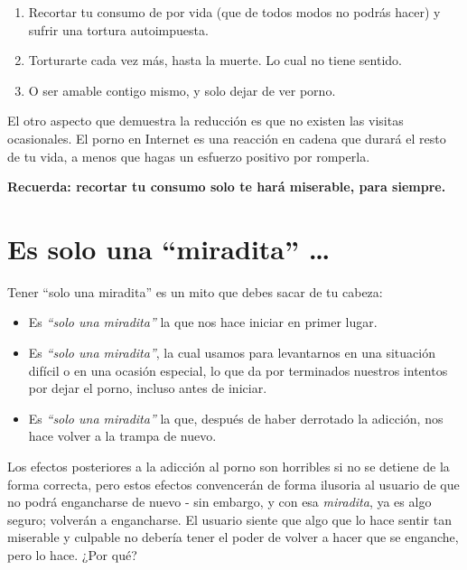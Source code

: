 \documentclass[
]{book}
\providecommand{\tightlist}{%
  \setlength{\itemsep}{0pt}\setlength{\parskip}{0pt}}
\begin{document}
\begin{enumerate}
\def\labelenumi{\arabic{enumi}.}
\tightlist
\item
  Recortar tu consumo de por vida (que de todos modos no podrás hacer) y sufrir una tortura autoimpuesta.
\item
  Torturarte cada vez más, hasta la muerte. Lo cual no tiene sentido.
\item
  O ser amable contigo mismo, y solo dejar de ver porno.
\end{enumerate}

El otro aspecto que demuestra la reducción es que no existen las visitas ocasionales. El porno en Internet es una reacción en cadena que durará el resto de tu vida, a menos que hagas un esfuerzo positivo por romperla.

\textbf{Recuerda: recortar tu consumo solo te hará miserable, para siempre.}

\hypertarget{es-solo-una-miradita}{%
\chapter{Es solo una ``miradita'' \ldots{}}\label{es-solo-una-miradita}}

Tener ``solo una miradita'' es un mito que debes sacar de tu cabeza:

\begin{itemize}
\tightlist
\item
  Es \emph{``solo una miradita''} la que nos hace iniciar en primer lugar.
\item
  Es \emph{``solo una miradita''}, la cual usamos para levantarnos en una situación difícil o en una ocasión especial, lo que da por terminados nuestros intentos por dejar el porno, incluso antes de iniciar.
\item
  Es \emph{``solo una miradita''} la que, después de haber derrotado la adicción, nos hace volver a la trampa de nuevo.
\end{itemize}

Los efectos posteriores a la adicción al porno son horribles si no se detiene de la forma correcta, pero estos efectos convencerán de forma ilusoria al usuario de que no podrá engancharse de nuevo - sin embargo, y con esa \emph{miradita}, ya es algo seguro; volverán a engancharse. El usuario siente que algo que lo hace sentir tan miserable y culpable no debería tener el poder de volver a hacer que se enganche, pero lo hace. ¿Por qué?
\end{document}
